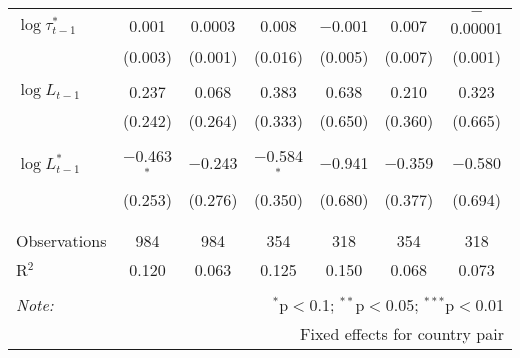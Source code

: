 \begin{tabular}{@{\extracolsep{5pt}}lcccccc}
 $\log \tau_{t-1}^*$ & 0.001 & 0.0003 & 0.008 & $-$0.001 & 0.007 & $-$0.00001 \\ 
  & (0.003) & (0.001) & (0.016) & (0.005) & (0.007) & (0.001) \\ 
  & & & & & & \\ 
 $\log L_{t-1}$ & 0.237 & 0.068 & 0.383 & 0.638 & 0.210 & 0.323 \\ 
  & (0.242) & (0.264) & (0.333) & (0.650) & (0.360) & (0.665) \\ 
  & & & & & & \\ 
 $\log L_{t-1}^*$ & $-$0.463$^{*}$ & $-$0.243 & $-$0.584$^{*}$ & $-$0.941 & $-$0.359 & $-$0.580 \\ 
  & (0.253) & (0.276) & (0.350) & (0.680) & (0.377) & (0.694) \\ 
  & & & & & & \\ 
\hline \\[-1.8ex] 
Observations & 984 & 984 & 354 & 318 & 354 & 318 \\ 
R$^{2}$ & 0.120 & 0.063 & 0.125 & 0.150 & 0.068 & 0.073 \\ 
\hline 
\hline \\[-1.8ex] 
\textit{Note:}  & \multicolumn{6}{r}{$^{*}$p$<$0.1; $^{**}$p$<$0.05; $^{***}$p$<$0.01} \\ 
 & \multicolumn{6}{r}{Fixed effects for country pair} \\ 
\end{tabular} 
